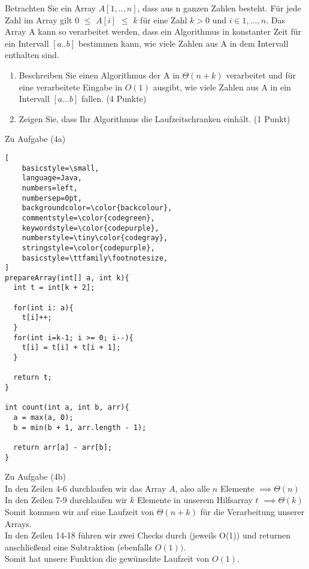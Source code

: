 \documentclass[ngerman,landscape,twocolumn]{adtexsheet}
\begin{document}
\begin{question}
Betrachten Sie ein Array $A[1,..,n]$, dass aus n ganzen Zahlen besteht. Für jede Zahl
im Array gilt 0 $\leq$ $A[i]$ $\leq$ $k$ für eine Zahl $k > 0$ und $i \in {1, ..., n}$. Das Array A kann so verarbeitet werden, dass ein Algorithmus in konstanter Zeit für ein Intervall $[a..b]$ bestimmen kann, wie viele Zahlen aus A in dem Intervall enthalten sind.
    \begin{enumerate}
        \item Beschreiben Sie einen Algorithmus der A in $\Theta(n + k)$ verarbeitet und für eine
        verarbeitete Eingabe in $O(1)$ ausgibt, wie viele Zahlen aus A in ein Intervall $[a...b]$
        fallen. (4 Punkte)
        \item Zeigen Sie, dass Ihr Algorithmus die Laufzeitschranken einhält. (1 Punkt)
    \end{enumerate}
\end{question}

Zu Aufgabe (4a)
\begin{lstlisting}[
    basicstyle=\small,
    language=Java,
    numbers=left,                    
    numbersep=0pt,
    backgroundcolor=\color{backcolour},   
    commentstyle=\color{codegreen},
    keywordstyle=\color{codepurple},
    numberstyle=\tiny\color{codegray},
    stringstyle=\color{codepurple},
    basicstyle=\ttfamily\footnotesize,
]
prepareArray(int[] a, int k){
  int t = int[k + 2];

  for(int i: a){
    t[i]++;
  }
  for(int i=k-1; i >= 0; i--){
    t[i] = t[i] + t[i + 1];
  }

  return t;
}

int count(int a, int b, arr){
  a = max(a, 0);
  b = min(b + 1, arr.length - 1);
    
  return arr[a] - arr[b];
}
\end{lstlisting}

Zu Aufgabe (4b)\\
In den Zeilen 4-6 durchlaufen wir das Array $A$, also alle $n$ Elemente $\implies \Theta(n)$ \\
In den Zeilen 7-9 durchlaufen wir $k$ Elemente in unserem Hilfsarray $t$ $\implies \Theta(k)$\\
Somit kommen wir auf eine Laufzeit von $\Theta(n+k)$ für die Verarbeitung unserer Arrays.\\
In den Zeilen 14-18 führen wir zwei Checks durch (jeweils O(1)) und returnen anschließend eine Subtraktion (ebenfalls $O(1))$.\\
Somit hat unsere Funktion die gewünschte Laufzeit von $O(1)$.
\end{document}
